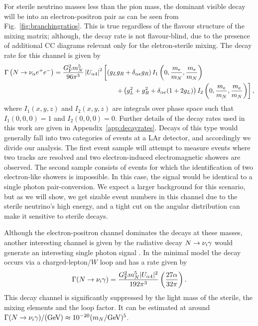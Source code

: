 \documentclass[11pt, a4paper]{article}
\newcommand{\reffig}[1]{Fig.~\ref{#1}}
\newcommand{\refapp}[1]{Appendix~\ref{#1}}
\def\ster{\ensuremath N}
\begin{document}
For sterile neutrino masses less than the pion mass, the dominant visible decay
will be into an electron-positron pair as can be seen from
\reffig{fig:branchingratios}. This is true regardless of the flavour structure
of the mixing matrix; although, the decay rate is not flavour-blind, due to the
presence of additional CC diagrams relevant only for the eletron-sterile
mixing. The decay rate for this channel is given by 
%
\begin{align*} \Gamma\left(\ster\to \nu_\alpha e^+e^-\right) =
\frac{G_\text{F}^2m_\ster^5}{96\pi^3}\left|U_{\alpha 4}\right|^2&\left[\left( g_Lg_R + \delta_{\alpha e}g_R\right)I_1\left(0,\frac{m_e}{m_\ster}, \frac{
m_e}{m_\ster}\right)\right.\\ 
&\left.\qquad + \left(g_L^2 + g_R^2 + \delta_{\alpha e}(1+2g_L)\right)I_2\left(0,\frac{m_e}{m_\ster},\frac{m_e}{m_\ster}\right)\right],  \end{align*}
%
where $I_1(x,y,z)$ and $I_2(x,y,z)$ are integrals over phase space such that $I_1(0,0,0) = 1$ and $I_2(0,0,0) = 0$. Further details of the decay rates used in this work are given in
\refapp{app:decayrates}.
%
Decays of this type would generally fall into two categories of events at a LAr
detector, and accordingly we divide our analysis. The first event sample will
attempt to measure events where two tracks are resolved and two
electron-induced electromagnetic showers are observed.
%
The second sample consists of events for which the identification of two
electron-like showers is impossible. In this case, the signal would be
identical to a single photon pair-conversion. We expect a larger background for
this scenario, but as we will show, we get sizable event numbers in this
channel due to the sterile neutrino's high energy, and a tight cut on the
angular distribution can make it sensitive to sterile decays.

Although the electron-positron channel dominates the decays at these masses,
another interesting channel is given by the radiative decay
$\ster\to\nu_i\gamma$ would generate an interesting single photon signal
\cite{PhysRevD.25.766}. In the minimal model the decay occurs via a
charged-lepton/$W$ loop and has a rate given by
%
\[ \Gamma(\ster\to\nu_i\gamma) = \frac{G_\text{F}^2m_\ster^5 |U_{\alpha
4}|^2}{192 \pi^3} \left( \frac{27 \alpha}{32 \pi} \right). \]
%
This decay channel is significantly suppressed by the light mass of the
sterile, the mixing elements and the loop factor. It can be estimated at
around $\Gamma(\ster\to\nu_i\gamma)/(\text{GeV}) \approx 10^{-20}
(m_\ster/\text{GeV})^5$.  
\end{document}
